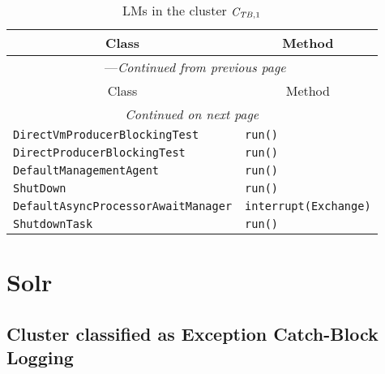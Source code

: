 \begin{center}
\begin{longtable}{ll}
\caption{LMs in the cluster $\mathit{C}_{\mathit{TB},1}$}\\
\toprule\multicolumn{1}{c}{Class}&\multicolumn{1}{c}{Method}\\\midrule
\endfirsthead

\multicolumn{2}{c}{\tablename\ \thetable{}---\textit{Continued from previous page}} \\\midrule
\multicolumn{1}{c}{Class}&\multicolumn{1}{c}{Method}\\\midrule
\endhead
\multicolumn{2}{c}{\textit{Continued on next page}}\\\midrule
\endfoot
\bottomrule
\endlastfoot

\lstinline/DirectVmProducerBlockingTest/&{\lstinline/run()/}\\
\lstinline/DirectProducerBlockingTest/&{\lstinline/run()/}\\
\lstinline/DefaultManagementAgent/&{\lstinline/run()/}\\
\lstinline/ShutDown/&{\lstinline/run()/}\\
\lstinline/DefaultAsyncProcessorAwaitManager/&{\lstinline/interrupt(Exchange)/}\\
\lstinline/ShutdownTask/&{\lstinline/run()/}\\
\end{longtable}
\end{center}

\section{Solr}\label{solr}

\subsection{Cluster classified as Exception Catch-Block Logging}

